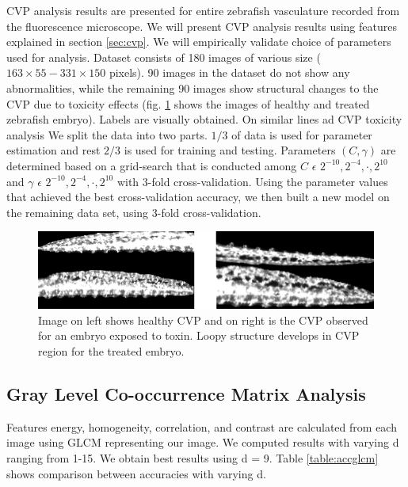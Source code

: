 CVP analysis results are presented for entire zebrafish vasculature recorded from the fluorescence microscope. We will present CVP analysis results using features explained in section \ref{sec:cvp}. We will empirically validate choice of parameters used for analysis. Dataset consists of 180 images of various size ($163 \times 55 - 331 \times 150$ pixels). 90 images in the dataset do not show any abnormalities, while the remaining 90 images show structural changes to the CVP due to toxicity effects (fig. \ref{cv} shows the images of healthy and treated zebrafish embryo). Labels are visually obtained. On similar lines ad CVP toxicity analysis We split the data into two parts. $1/3$ of data is used for parameter estimation and rest $2/3$ is used for training and testing. Parameters $(C, \gamma)$ are determined based on a grid-search that is conducted among $C$ $\epsilon$ {$2^{-10}, 2^{-4}, \cdot, 2^{10}$} and $\gamma$ $\epsilon$ {$2^{-10}, 2^{-4}, \cdot, 2^{10}$} with 3-fold cross-validation. Using the parameter values that achieved the best cross-validation accuracy, we then built a new model on the remaining data set, using 3-fold cross-validation. 

\begin{figure}[htb] \centering
\includegraphics[scale=0.95]{figure/cv.png}
  \caption[Healthy and treated CVP]{Image on left shows healthy CVP and on right is the CVP observed for an embryo exposed to toxin. Loopy structure develops in CVP region for the treated embryo.}
 \label{cv}
\end{figure}

\subsection{Gray Level Co-occurrence Matrix Analysis}

Features energy, homogeneity, correlation, and contrast are calculated from each image using GLCM representing our image. We computed results with varying d ranging from 1-15. We obtain best results using d = 9. Table \ref{table:accglcm} shows comparison between accuracies with varying d. 

